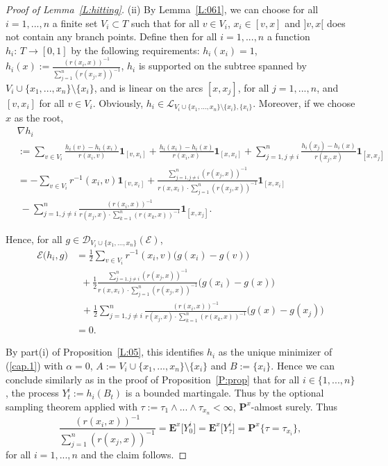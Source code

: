 \documentclass[11pt]{amsart}
\numberwithin{equation}{section}
\begin{document}
{\begin{proof}[Proof of Lemma~\ref{L:hitting}]
(ii)
By Lemma~\ref{L:061}, we can choose for all $i=1,...,n$ a finite set $V_i\subset T$ such that  for all $v\in V_i$, $x_i\in[v,x]$ and $]v,x[$
does not contain any branch points.
Define then for all $i=1,...,n$ a function $h_{i}:\,T\to[0,1]$
by the following requirements: $h_i(x_i)=1$, $h_i(x):=\frac{(r(x_i,x))^{-1}}{\sum_{j=1}^n(r(x_j,x))^{-1}}$,
$h_i$ is supported on the subtree spanned by $V_i\cup \{x_1,...,x_n\}\setminus\{x_i\}$, and is linear on the arcs $[x,x_j]$, for all $j=1,...,n$, and $[v,x_i]$ for all $v\in V_i$.
Obviously, $h_i\in {\mathcal L}_{V_i\cup\{x_1,...,x_n\}\setminus\{x_i\},\{x_i\}}$.
Moreover, if we choose $x$ as the root,
\begin{equation}
\label{e:005}
\begin{aligned}
   &\nabla h_i
  \\
 &:=\sum_{v\in V_i}\tfrac{h_i(v)-h_i(x_i)}{r(x_i,v)}\mathbf{1}_{[v,x_i]}+\tfrac{h_i(x_i)-h_i(x)}{r(x_i,x)}\mathbf{1}_{[x,x_i]}+\sum_{j=1,j\not =i}^n\tfrac{h_i(x_j)-h_i(x)}{r(x_j,x)}\mathbf{1}_{[x,x_j]}
  \\
 &=
   -\sum_{v\in V_i}r^{-1}(x_i,v)\mathbf{1}_{[v,x_i]}+\frac{\sum_{j=1,j\not =i}^n(r(x_j,x))^{-1}}{r(x,x_i)\cdot \sum_{j=1}^n(r(x_j,x))^{-1}}\mathbf{1}_{[x,x_i]}
  \\
 &\;-\sum_{j=1,j\not =i}^n\tfrac{(r(x_i,x))^{-1}}{r(x_j,x)\cdot \sum_{k=1}^n(r(x_k,x))^{-1}}\mathbf{1}_{[x,x_j]}.
\end{aligned}
\end{equation}

Hence, for
all $g\in{\mathcal D}_{V_i\cup\{x_1,...,x_n\}}({\mathcal E})$,
\begin{equation}
\label{e:hn}
\begin{aligned}
   {\mathcal E}\big(h_i,g\big)
 &=
   \tfrac{1}{2}\sum_{v\in V_i}r^{-1}(x_i,v)\big(g(x_i)-g(v)\big)\\
&\;\ +\tfrac{1}{2}\frac{\sum_{j=1,j\not =i}^n(r(x_j,x))^{-1}}{r(x,x_i)\cdot \sum_{j=1}^n(r(x_j,x))^{-1}}\big(g(x_i)-g(x)\big)
  \\
 &\;\;+\tfrac{1}{2}\sum_{j=1,j\not =i}^n\tfrac{(r(x_i,x))^{-1}}{r(x_j,x)\cdot \sum_{k=1}^n(r(x_k,x))^{-1}}
   \big(g(x)-g(x_j)\big)
  \\
 &=
  0.
\end{aligned}
\end{equation}

By part(i) of Proposition~\ref{L:05}, this identifies $h_i$ as the unique minimizer of (\ref{cap.1}) with
$\alpha=0$, $A:=V_i\cup\{x_1,...,x_n\}\setminus\{x_i\}$ and $B:=\{x_i\}$. Hence we can conclude similarly as in the proof of Proposition~\ref{P:prop} that for all $i\in\{1,...,n\}$, the process $Y^i_t:=h_i(B_t)$ is a bounded martingale. Thus by the optional sampling theorem applied with
$\tau:=\tau_1\wedge ...\wedge\tau_{x_n}<\infty$, $\mathbf{P}^x$-almost surely. Thus
\begin{equation}
\label{equation}
   \frac{(r(x_i,x))^{-1}}{\sum_{j=1}^n(r(x_j,x))^{-1}}=\mathbf{E}^x\big[Y^{i}_0\big]=\mathbf{E}^x\big[Y^{i}_\tau\big]
 =
   \mathbf{P}^x\big\{\tau=\tau_{x_i}\big\},
\end{equation}
for all $i=1,...,n$ and the claim follows.
\end{proof}{\smallskip}

}
\end{document}
